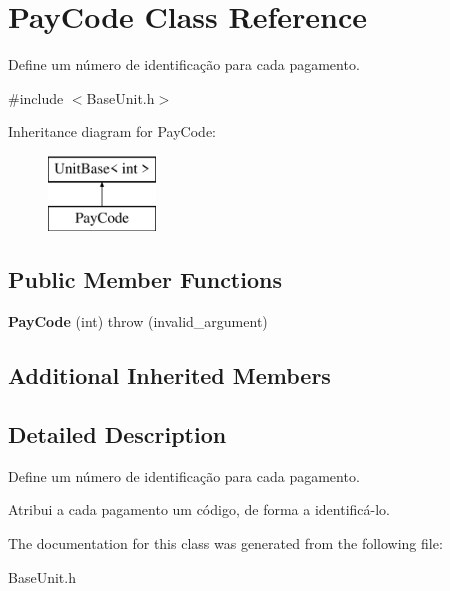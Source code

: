 \hypertarget{classPayCode}{\section{Pay\-Code Class Reference}
\label{classPayCode}
}


Define um número de identificação para cada pagamento.  




{\ttfamily \#include $<$Base\-Unit.\-h$>$}

Inheritance diagram for Pay\-Code\-:\begin{figure}[H]
\begin{center}
\leavevmode
\includegraphics[height=2.000000cm]{classPayCode}
\end{center}
\end{figure}
\subsection*{Public Member Functions}
\begin{DoxyCompactItemize}
\item 
\hypertarget{classPayCode_aa867c5138d3d6858cfc7d87d08ef9599}{{\bfseries Pay\-Code} (int)  throw (invalid\-\_\-argument)}\label{classPayCode_aa867c5138d3d6858cfc7d87d08ef9599}

\end{DoxyCompactItemize}
\subsection*{Additional Inherited Members}


\subsection{Detailed Description}
Define um número de identificação para cada pagamento. 

Atribui a cada pagamento um código, de forma a identificá-\/lo. 

The documentation for this class was generated from the following file\-:\begin{DoxyCompactItemize}
\item 
Base\-Unit.\-h\end{DoxyCompactItemize}
